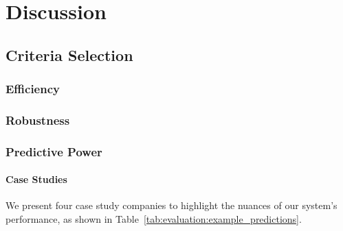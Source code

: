 ﻿\documentclass[../thesis/thesis.tex]{subfiles}
\begin{document}
\chapter{Discussion}
\label{chap:discussion}

\section{Criteria Selection}

\subsection{Efficiency}

\subsection{Robustness}

\subsection{Predictive Power}

\subsubsection{Case Studies}

We present four case study companies to highlight the nuances of our system's performance, as shown in Table~\ref{tab:evaluation:example_predictions}. 
\end{document}
